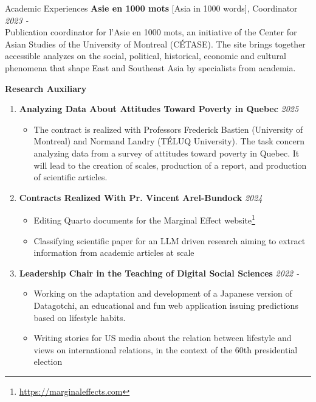 \documentclass{resume} %
\begin{document}
\begin{rSection}{Academic Experiences}
{\bf Asie en 1000 mots}{ [Asia in 1000 words], Coordinator} \hfill {\em 2023 - }\\
Publication coordinator for l'Asie en 1000 mots, an initiative of the Center for Asian Studies of the University of Montreal (CÉTASE). The site brings together accessible analyzes on the social, political, historical, economic and cultural phenomena that shape East and Southeast Asia by specialists from academia. 

\clearpage

{\bf Research Auxiliary}
\begin{enumerate}
    \item \textbf{Analyzing Data About Attitudes Toward Poverty in Quebec} \hfill {\em 2025}
        \begin{itemize}
            \item The contract is realized with Professors Frederick Bastien (University of Montreal) and Normand Landry (TÉLUQ University). The task concern analyzing data from a survey of attitudes toward poverty in Quebec. It will lead to the creation of scales, production of a report, and production of scientific articles. 
        \end{itemize}
    \item \textbf{Contracts Realized With Pr. Vincent Arel-Bundock} \hfill {\em 2024}
        \begin{itemize}
            \item Editing Quarto documents for the Marginal Effect website\footnote{\url{https://marginaleffects.com}}
            \item Classifying scientific paper for an LLM driven research aiming to extract information from academic articles at scale
        \end{itemize}
    \item \textbf{Leadership Chair in the Teaching of Digital Social Sciences} \hfill {\em 2022 -}
        \begin{itemize}
            \item {Working on the adaptation and development of a Japanese version of Datagotchi, an educational and fun web application issuing predictions based on lifestyle habits.}
            \item Writing stories for US media about the relation between lifestyle and views on international relations, in the context of the 60th presidential election 

\end{itemize}
\end{enumerate}
\end{rSection}
\end{document}
